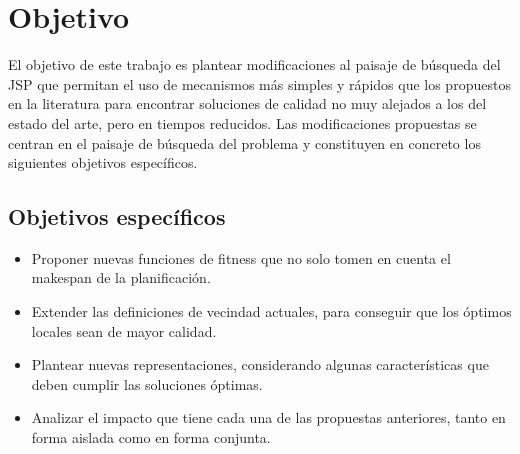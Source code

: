 \section{Objetivo}

El objetivo de este trabajo es plantear modificaciones al paisaje de búsqueda del JSP que permitan el uso de mecanismos más simples y rápidos que los propuestos
en la literatura para encontrar soluciones de calidad no muy alejados a los del estado del arte, pero en tiempos reducidos.
%
Las modificaciones propuestas se centran en el paisaje de búsqueda del problema y constituyen en concreto los siguientes objetivos específicos.

\subsection*{Objetivos específicos}
\begin{itemize}
\item Proponer nuevas funciones de fitness que no solo tomen en cuenta el makespan de la planificación.
\item Extender las definiciones de vecindad actuales, para conseguir que los óptimos locales sean de mayor calidad. 
\item Plantear nuevas representaciones, considerando algunas características que deben cumplir las soluciones óptimas.
\item Analizar el impacto que tiene cada una de las propuestas anteriores, tanto en forma aislada como en forma conjunta.
\end{itemize}

